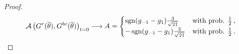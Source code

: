 \begin{proof}
\begin{equation*}
    \mathcal{A}\left( G^r(\overline{\theta}) , G^{bc}(\overline{\theta})  \right)_{t = 0} \longrightarrow  A =  \begin{cases}
        \operatorname{sgn} (g_{-1} - g_1)  \frac{3}{\sqrt{21}}  & \text{with prob. $\frac{1}{2}$}\,, \\
       - \operatorname{sgn} (g_{-1} - g_1)  \frac{3}{\sqrt{21}} & \text{with prob. $\frac{1}{2}$}\,.
      \end{cases}
\end{equation*}
















\end{proof}
